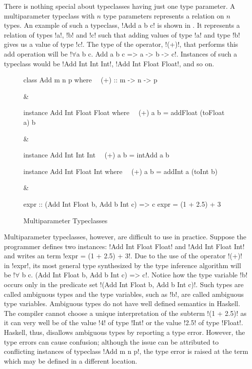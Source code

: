 \documentclass[format=acmsmall,manuscript,review,screen,nonacm,margin=1in,11pt]{acmart}
\begin{document}
There is nothing special about typeclasses having just one type parameter. 
A multiparameter typeclass with $n$ type parameters represents a relation on $n$ types.
An example of such a typeclass, !Add a b c! is shown in .
It represents a relation of types !a!, !b! and !c! such that adding values of type !a! and type !b!
gives us a value of type !c!. The type of the operator, !(+)!, that performs this add operation will be
!$\forall$a b c. Add a b c => a -> b -> c!. Instances of such a typeclass would be !Add Int Int Int!,
!Add Int Float Float!, and so on.
\begin{figure}[ht]
  \footnotesize
  \begin{tabularx}\textwidth{c c c}
\begin{code}^^J
class Add m n p where^^J
\ \ (+) :: m -> n -> p^^J
\end{code}&%
\begin{code}^^J
instance Add Int Float Float where^^J
\ \ (+) a b = addFloat (toFloat a) b^^J
\end{code}&%
\begin{code}^^J
instance Add Int Int Int^^J
\ \ (+) a b = intAdd a b^^J
\end{code}
  \end{tabularx}
  \begin{tabularx}\textwidth{X X}
\begin{code}^^J
instance Add Int Float Int where^^J
\ \ (+) a b = addInt a (toInt b)^^J
\end{code}&%
\begin{code}^^J
expr :: (Add Int Float b, Add b Int c) => c^^J
expr = (1 + 2.5) + 3^^J
\end{code}
  \end{tabularx}
  \caption{Multiparameter Typeclasses}
  \label{fig:multip-typeclass}
\end{figure}

Multiparameter typeclasses, however, are difficult to use in practice.
Suppose the programmer defines two instances: !Add Int Float Float! and !Add Int Float Int!
and writes an term !expr = (1 + 2.5) + 3!.
Due to the use of the operator !(+)! in !expr!, its most general type synthesized
by the type inference algorithm will be !$\forall$ b c. (Add Int Float b, Add b Int c) => c!.
Notice how the type variable !b! occurs only in the predicate set !(Add Int Float b, Add b Int c)!.
Such types are called ambiguous types and the type variables, such as !b!,
are called ambiguous type variables. Ambiguous types do not have well defined semantics in Haskell.
The compiler cannot choose a unique interpretation of the subterm !(1 + 2.5)! as it can very well be
of the value !4! of type !Int! or the value !2.5! of type !Float!.
Haskell, thus, disallows ambiguous types by reporting a type error.
However, the type errors can cause confusion; although the issue can be attributed to
conflicting instances of typeclass !Add m n p!, the type error is raised at the term which may
be defined in a different location.
\end{document}
